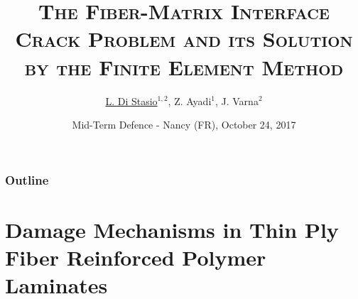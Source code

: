 \documentclass[first,firstsupp,lastsupp,last,hyperref,table]{ETHclass}
\makeatletter
\newenvironment{withoutheadline}{
         \setbeamertemplate{headline}{%
\vspace{35pt}
}
    }{}
\makeatother
\begin{document}

\title[\textsc{FEM \& the Fiber-Matrix Interface Crack}]{\textsc{The Fiber-Matrix Interface Crack Problem and its Solution by the Finite Element Method}}
\author{ \underline{L. Di Stasio}$^{1,2}$, Z. Ayadi$^{1}$, J. Varna$^{2}$}
\date{Mid-Term Defence - Nancy (FR), October 24, 2017}

\begin{frame}[plain]
    \titlepage

\end{frame}

\begin{withoutheadline}
\begin{frame}
\frametitle{Outline}
\justifying
\vspace*{-0.5cm}
\tableofcontents[hidesubsections]
\end{frame}
\end{withoutheadline}



\section[Damage in Thin Ply FRPC]{Damage Mechanisms in Thin Ply Fiber Reinforced Polymer Laminates}
\end{document}
